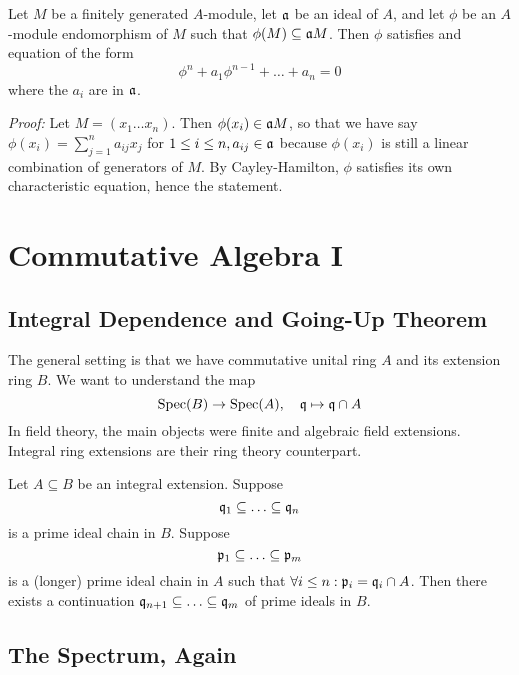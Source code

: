 \begin{lemma}
    Let $M$ be a finitely generated $A$-module, let $\mathfrak{a}$ be an ideal of $A$, and let $\phi$ be an $A$-module endomorphism of $M$ such that $\phi(M)\subseteq \mathfrak{a} M$. Then $\phi$ satisfies and equation of the form 
    $$\phi^n + a_1 \phi^{n-1}+\ldots + a_n = 0$$
    where the $a_i$ are in $\mathfrak{a}$.
\end{lemma}

\textit{Proof:} Let $M=(x_1\ldots x_n)$. Then $\phi(x_i) \in \mathfrak{a} M$, so that we have say $\phi(x_i)=\sum^n_{j=1}a_{ij}x_j$ for $1\leq i \leq n, a_{ij}\in \mathfrak{a}$ because $\phi(x_i)$ is still a linear combination of generators of $M$. By Cayley-Hamilton, $\phi$ satisfies its own characteristic equation, hence the statement.

\section{Commutative Algebra I}
\subsection{Integral Dependence and Going-Up Theorem}

The general setting is that we have commutative unital ring $A$ and its extension ring $B$. We want to understand the map $$\operatorname{Spec}(B)\rightarrow\operatorname{Spec}(A), \quad \mathfrak{q} \mapsto \mathfrak{q} \cap A$$
In field theory, the main objects were finite and algebraic field extensions. Integral ring extensions are their ring theory counterpart. 

\begin{theorem}
    Let $A\subseteq B$ be an integral extension. Suppose $$\mathfrak{q}_1 \subseteq \ldots \subseteq \mathfrak{q}_n$$ is a prime ideal chain in $B$. Suppose $$\mathfrak{p}_1 \subseteq \ldots \subseteq \mathfrak{p}_m$$ is a (longer) prime ideal chain in $A$ such that $\forall i \leq n: \mathfrak{p}_i = \mathfrak{q}_i \cap A$.
    Then there exists a continuation $\mathfrak{q}_{n+1} \subseteq \ldots \subseteq \mathfrak{q}_{m}$ of prime ideals in $B$.
\end{theorem}


\subsection{The Spectrum, Again}

